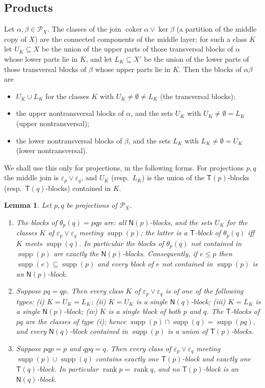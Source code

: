 \documentclass[11pt]{amsart}
\newtheorem{lemma}[theorem]{Lemma}
\theoremstyle{definition}
\renewcommand{\P}{\mathcal{P}}
\newcommand{\supp}{\operatorname{supp}}
\newcommand{\T}{\mathsf{T}}
\newcommand{\N}{\mathsf{N}}
\newcommand{\rk}{\operatorname{rank}}
\begin{document}
\subsection{Products}
Let $\alpha,\beta\in\P_X$. The classes of the join $\operatorname{coker}\alpha\vee\ker\beta$ (a partition of the middle copy of $X$) are the connected components of the middle layer; for such a class $K$ let $U_K\subseteq X$ be the union of the upper parts of those transversal blocks of $\alpha$ whose lower parts lie in $K$, and let $L_K\subseteq X'$ be the union of the lower parts of those transversal blocks of $\beta$ whose upper parts lie in $K$. Then the blocks of $\alpha\beta$ are
\begin{itemize}[nosep]
\item $U_K\cup L_K$ for the classes $K$ with $U_K\ne\emptyset\ne L_K$ (the transversal blocks);
\item the upper nontransversal blocks of $\alpha$, and the sets $U_K$ with $U_K\ne\emptyset=L_K$ (upper nontransversal);
\item the lower nontransversal blocks of $\beta$, and the sets $L_K$ with $L_K\ne\emptyset=U_K$ (lower nontransversal).
\end{itemize}
We shall use this only for projections, in the following forms. For projections $p,q$ the middle join is $\varepsilon_p\vee\varepsilon_q$, and $U_K$ (resp.\ $L_K$) is the union of the $\T(p)$-blocks (resp.\ $\T(q)$-blocks) contained in $K$.

\begin{lemma}\label{lem:PX}
Let $p,q$ be projections of $\P_X$.
\begin{enumerate}[label=\textup{(\alph*)}]
\item The blocks of $\theta_p(q)=pqp$ are: all $\N(p)$-blocks, and the sets $U_K$ for the classes $K$ of $\varepsilon_p\vee\varepsilon_q$ meeting $\supp(p)$; the latter is a $\T$-block of $\theta_p(q)$ iff $K$ meets $\supp(q)$. In particular the blocks of $\theta_p(q)$ not contained in $\supp(p)$ are exactly the $\N(p)$-blocks. Consequently, if $e\le p$ then $\supp(e)\subseteq\supp(p)$ and every block of $e$ not contained in $\supp(p)$ is an $\N(p)$-block.
\item Suppose $pq=qp$. Then every class $K$ of $\varepsilon_p\vee\varepsilon_q$ is of one of the following types: \textup{(i)} $K=U_K=L_K$; \textup{(ii)} $K=U_K$ is a single $\N(q)$-block; \textup{(iii)} $K=L_K$ is a single $\N(p)$-block; \textup{(iv)} $K$ is a single block of both $p$ and $q$. The $\T$-blocks of $pq$ are the classes of type \textup{(i)}; hence $\supp(p)\cap\supp(q)=\supp(pq)$, and every $\N(q)$-block contained in $\supp(p)$ is a union of $\T(p)$-blocks.
\item Suppose $pqp=p$ and $qpq=q$. Then every class of $\varepsilon_p\vee\varepsilon_q$ meeting $\supp(p)\cup\supp(q)$ contains exactly one $\T(p)$-block and exactly one $\T(q)$-block. In particular $\rk p=\rk q$, and no $\T(p)$-block is an $\N(q)$-block.
\end{enumerate}
\end{lemma}
\end{document}
